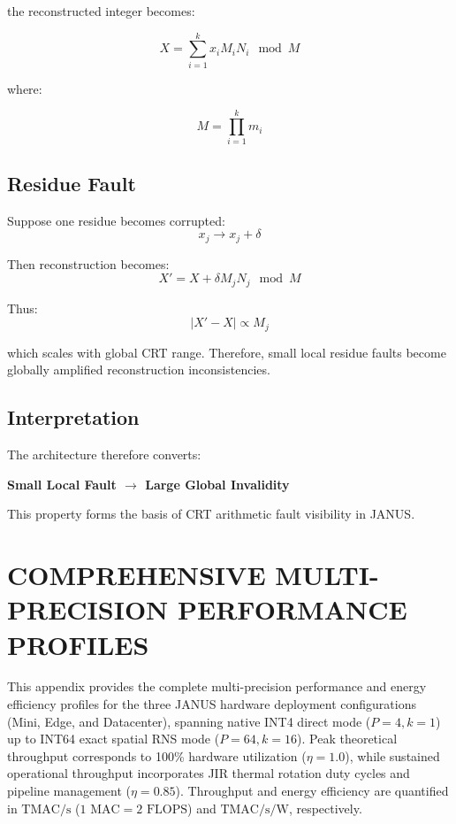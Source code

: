 \documentclass[journal]{IEEEtran}
\begin{document}
the reconstructed integer becomes:

\begin{equation}
X = \sum_{i=1}^k x_i M_i N_i \mod M
\end{equation}

where:

\begin{equation}
M = \prod_{i=1}^k m_i
\end{equation}

\subsection{\textbf{Residue Fault}}

Suppose one residue becomes corrupted:
\begin{equation}
x_j \rightarrow x_j + \delta
\end{equation}

Then reconstruction becomes:
\begin{equation}
X ' = X + \delta M_j N_j \mod M
\end{equation}

Thus:
\begin{equation}
|X ' - X| \propto M_j
\end{equation}

which scales with global CRT range. Therefore, small local residue faults become globally amplified reconstruction inconsistencies.

\subsection{\textbf{Interpretation}}

The architecture therefore converts:
\begin{center}
\textbf{Small Local Fault $\rightarrow$ Large Global Invalidity}
\end{center}

This property forms the basis of CRT arithmetic fault visibility in JANUS.

\section{COMPREHENSIVE MULTI-PRECISION PERFORMANCE PROFILES}
\label{app:perf_profiles}

This appendix provides the complete multi-precision performance and energy efficiency profiles for the three JANUS hardware deployment configurations (Mini, Edge, and Datacenter), spanning native INT4 direct mode ($P=4, k=1$) up to INT64 exact spatial RNS mode ($P=64, k=16$). Peak theoretical throughput corresponds to 100\% hardware utilization ($\eta = 1.0$), while sustained operational throughput incorporates JIR thermal rotation duty cycles and pipeline management ($\eta = 0.85$). Throughput and energy efficiency are quantified in $\text{TMAC/s}$ ($1\text{ MAC} = 2\text{ FLOPS}$) and $\text{TMAC/s/W}$, respectively.
\end{document}
